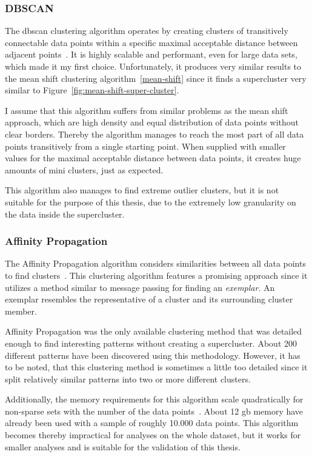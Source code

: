 \subsubsection{DBSCAN}
The \ac{dbscan} clustering algorithm operates by creating clusters of transitively connectable data points within a specific maximal acceptable distance between adjacent points~\cite{inproceedings:dbscan}.
It is highly scalable and performant, even for large data sets, which made it my first choice.
Unfortunately, it produces very similar results to the mean shift clustering algorithm~\ref{mean-shift} since it finds a supercluster very similar to Figure~\ref{fig:mean-shift-super-cluster}.

I assume that this algorithm suffers from similar problems as the mean shift approach, which are high density and equal distribution of data points without clear borders.
Thereby the algorithm manages to reach the most part of all data points transitively from a single starting point.
When supplied with smaller values for the maximal acceptable distance between data points, it creates huge amounts of mini clusters, just as expected.

This algorithm also manages to find extreme outlier clusters, but it is not suitable for the purpose of this thesis, due to the extremely low granularity on the data inside the supercluster.


\subsubsection{Affinity Propagation}
The Affinity Propagation algorithm considers similarities between all data points to find clusters~\cite{article:affinity-propagation}.
This clustering algorithm features a promising approach since it utilizes a method similar to message passing for finding an \emph{exemplar}.
An exemplar resembles the representative of a cluster and its surrounding cluster member.

Affinity Propagation was the only available clustering method that was detailed enough to find interesting patterns without creating a supercluster.
About 200 different patterns have been discovered using this methodology.
However, it has to be noted, that this clustering method is sometimes a little too detailed since it split relatively similar patterns into two or more different clusters.

Additionally, the memory requirements for this algorithm scale quadratically for non-sparse sets with the number of the data points~\cite[p.~ii]{article:affinity-propagation}.
About 12 \ac{gb} memory have already been used with a sample of roughly 10.000 data points.
This algorithm becomes thereby impractical for analyses on the whole dataset, but it works for smaller analyses and is suitable for the validation of this thesis.
